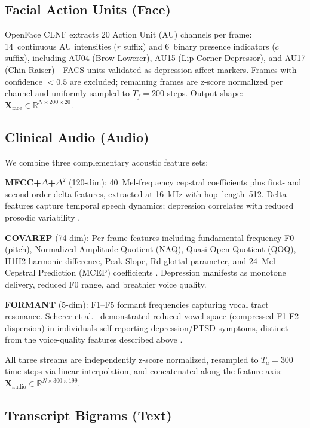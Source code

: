 \documentclass[journal]{IEEEtran}
\begin{document}
\subsection{Facial Action Units (Face)}

OpenFace CLNF \cite{baltrusaitis2016} extracts 20 Action Unit (AU) channels
per frame: 14~continuous AU intensities ($r$ suffix) and 6~binary
presence indicators ($c$ suffix), including AU04 (Brow Lowerer),
AU15 (Lip Corner Depressor), and AU17 (Chin Raiser)---FACS units
\cite{ekman1978} validated as depression affect markers. Frames with confidence
$<0.5$ are excluded; remaining frames are z-score normalized
per channel and uniformly sampled to $T_f=200$ steps.
Output shape: $\mathbf{X}_\text{face}\in\mathbb{R}^{N\times200\times20}$.

\subsection{Clinical Audio (Audio)}

We combine three complementary acoustic feature sets:

\textbf{MFCC+$\Delta$+$\Delta^2$} (120-dim): 40~Mel-frequency
cepstral coefficients plus first- and second-order delta features,
extracted at 16~kHz with hop~length~512. Delta features capture
temporal speech dynamics; depression correlates with reduced prosodic
variability \cite{ringeval2017}.

\textbf{COVAREP} (74-dim): Per-frame features including fundamental
frequency F0 (pitch), Normalized Amplitude Quotient (NAQ), Quasi-Open
Quotient (QOQ), H1H2 harmonic difference, Peak Slope, Rd glottal
parameter, and 24~Mel Cepstral Prediction (MCEP) coefficients
\cite{covarep2014}. Depression manifests as monotone delivery,
reduced F0 range, and breathier voice quality.

\textbf{FORMANT} (5-dim): F1--F5 formant frequencies capturing
vocal tract resonance. Scherer et al.\ \cite{scherer2016vowel}
demonstrated reduced vowel space (compressed F1-F2 dispersion) in
individuals self-reporting depression/PTSD symptoms, distinct from
the voice-quality features described above \cite{scherer2013voice}.

All three streams are independently z-score normalized, resampled to
$T_a=300$ time steps via linear interpolation, and concatenated along
the feature axis:
$\mathbf{X}_\text{audio}\in\mathbb{R}^{N\times300\times199}$.

\subsection{Transcript Bigrams (Text)}
\end{document}
